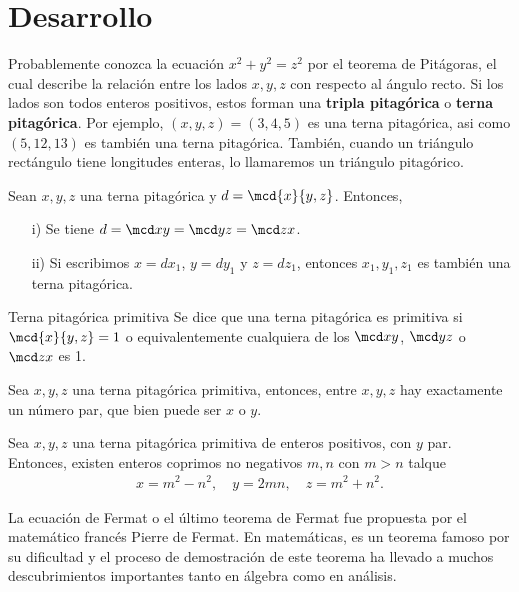 \section{Desarrollo}
Probablemente conozca la ecuación $x^2 + y^2 = z^2$ por el teorema de Pitágoras, el cual describe la relación entre los lados $x,y,z$ con respecto al ángulo recto.
Si los lados son todos enteros positivos, estos forman una \textbf{tripla pitagórica} o \textbf{terna pitagórica}.
Por ejemplo, $(x,y,z) = (3,4,5)$ es una terna pitagórica, asi como $(5,12,13)$ es también una terna pitagórica.
También, cuando un triángulo rectángulo tiene longitudes enteras, lo llamaremos un triángulo pitagórico.

\begin{lemma}
    Sean $x,y,z$ una terna pitagórica y $d = \mcd{x}{y,z}$.
    Entonces,
    \begin{enumerate}
        \item [i)] Se tiene $d = \mcd x y = \mcd y z = \mcd z x$.
        \item [ii)] Si escribimos $x = d x_1$, $y = d y_1$ y $z = d z_1$, entonces $x_1, y_1, z_1$ es también una terna pitagórica.
    \end{enumerate}
\end{lemma}

\begin{definition.box}{Terna pitagórica primitiva}{}
    Se dice que una terna pitagórica es primitiva si $\mcd{x}{y,z} = 1$ o equivalentemente cualquiera de los $\mcd x y$, $\mcd y z$ o $\mcd z x$ es 1.
\end{definition.box}

\begin{lemma}
    Sea $x,y,z$ una terna pitagórica primitiva, entonces, entre $x,y,z$ hay exactamente un número par, que bien puede ser $x$ o $y$.
\end{lemma}

\begin{theorem.box}{}{}
    Sea $x,y,z$ una terna pitagórica primitiva de enteros positivos, con $y$ par.
    Entonces, existen enteros coprimos no negativos $m,n$ con $m > n$ talque
    \begin{align*}
        x = m^2 - n^2,\quad y = 2mn,\quad z = m^2 + n^2.
    \end{align*}
\end{theorem.box}

La ecuación de Fermat o el último teorema de Fermat fue propuesta por el matemático francés Pierre de Fermat.
En matemáticas, es un teorema famoso por su dificultad y el proceso de demostración de este teorema ha llevado a muchos descubrimientos importantes tanto en álgebra como en análisis.

